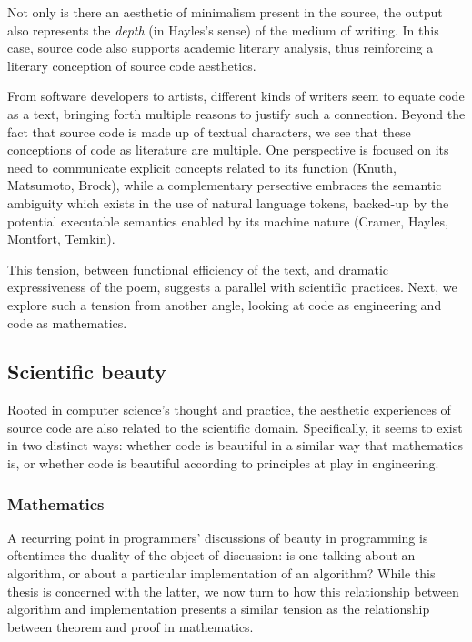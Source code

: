 Not only is there an aesthetic of minimalism present in the source, the output also represents the \emph{depth} (in Hayles's sense) of the medium of writing. In this case, source code also supports academic literary analysis, thus reinforcing a literary conception of source code aesthetics.

From software developers to artists, different kinds of writers seem to equate code as a text, bringing forth multiple reasons to justify such a connection. Beyond the fact that source code is made up of textual characters, we see that these conceptions of code as literature are multiple. One perspective is focused on its need to communicate explicit concepts related to its function (Knuth, Matsumoto, Brock), while a complementary persective embraces the semantic ambiguity which exists in the use of natural language tokens, backed-up by the potential executable semantics enabled by its machine nature (Cramer, Hayles, Montfort, Temkin).

This tension, between functional efficiency of the text, and dramatic expressiveness of the poem, suggests a parallel with scientific practices. Next, we explore such a tension from another angle, looking at code as engineering and code as mathematics.

\subsection{Scientific beauty}
\label{subsec:scientific-beauty}

Rooted in computer science's thought and practice, the aesthetic experiences of source code are also related to the scientific domain. Specifically, it seems to exist in two distinct ways: whether code is beautiful in a similar way that mathematics is, or whether code is beautiful according to principles at play in engineering.

\subsubsection{Mathematics}
\label{subsubsec:beauty-mathematics}

A recurring point in programmers' discussions of beauty in programming is oftentimes the duality of the object of discussion: is one talking about an algorithm, or about a particular implementation of an algorithm? While this thesis is concerned with the latter, we now turn to how this relationship between algorithm and implementation presents a similar tension as the relationship between theorem and proof in mathematics.

